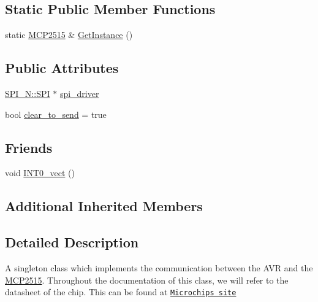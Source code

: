 \subsection*{Static Public Member Functions}
\begin{DoxyCompactItemize}
\item 
static \hyperlink{class_m_c_p2515}{M\-C\-P2515} \& \hyperlink{class_m_c_p2515_a3f53839a9258086fd21e2fc4190de60d}{Get\-Instance} ()
\end{DoxyCompactItemize}
\subsection*{Public Attributes}
\begin{DoxyCompactItemize}
\item 
\hyperlink{class_s_p_i___n_1_1_s_p_i}{S\-P\-I\-\_\-\-N\-::\-S\-P\-I} $\ast$ \hyperlink{class_m_c_p2515_a3a5ca0d606115f1551a06d871606540e}{spi\-\_\-driver}
\item 
bool \hyperlink{class_m_c_p2515_a2cdd8da004f1f17e1f17d426071d80b9}{clear\-\_\-to\-\_\-send} = true
\end{DoxyCompactItemize}
\subsection*{Friends}
\begin{DoxyCompactItemize}
\item 
void \hyperlink{class_m_c_p2515_aee50ec5936d22b665b9a06ff6bafd1b9}{I\-N\-T0\-\_\-vect} ()
\end{DoxyCompactItemize}
\subsection*{Additional Inherited Members}


\subsection{Detailed Description}
A singleton class which implements the communication between the A\-V\-R and the \hyperlink{class_m_c_p2515}{M\-C\-P2515}. Throughout the documentation of this class, we will refer to the datasheet of the chip. This can be found at \href{http://ww1.microchip.com/downloads/en/DeviceDoc/21801G.pdf}{\tt Microchips site} 

